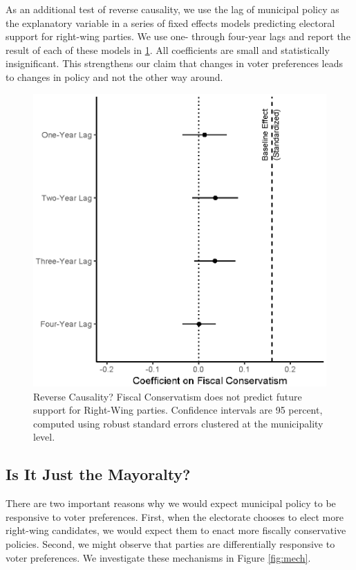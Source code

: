 \documentclass[a4paper,12pt]{article}
\begin{document}
\setcounter{table}{0}
\setcounter{figure}{0}

As an additional test of reverse causality, we use the lag of municipal policy as the explanatory variable in a series of fixed effects models predicting electoral support for right-wing parties. We use one- through four-year lags and report the result of each of these models in  \ref{fig:granger}. All coefficients are small and statistically insignificant. This strengthens our claim that changes in voter preferences leads to changes in policy and not the other way around.


\begin{figure}[!htb]
	\centering
	\includegraphics[scale = 1]{granger_18092018.eps}
	\caption{Reverse Causality? Fiscal Conservatism does not predict future support for Right-Wing parties. Confidence intervals are 95 percent, computed using robust standard errors clustered at the municipality level.} \label{fig:granger}
\end{figure}
\clearpage
\subsection{Is It Just the Mayoralty?}\label{mechanism}

There are two important reasons why we would expect municipal policy to be responsive to voter preferences. First, when the electorate chooses to elect more right-wing candidates, we would expect them to enact more fiscally conservative policies. Second, we might observe that parties are differentially responsive to voter preferences. We investigate these mechanisms in Figure \ref{fig:mech}.
\end{document}
